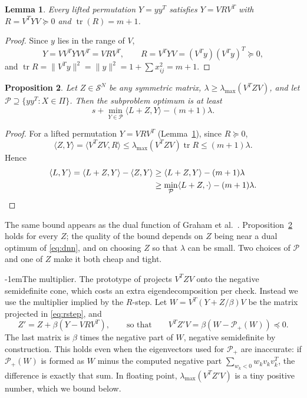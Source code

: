 \documentclass[10pt]{article}
\makeatletter
\renewcommand\paragraph{\@startsection{paragraph}{4}{\z@}{2.5ex plus 1ex minus .2ex}%
  {-1em}{\normalfont\normalsize\bfseries}}
\newtheorem{proposition}{Proposition}
\newtheorem{lemma}[proposition]{Lemma}
\theoremstyle{remark}
\newcommand{\Sym}{\mathcal{S}}
\newcommand{\tr}{\operatorname{tr}}
\newcommand{\inner}[2]{\langle #1, #2\rangle}
\newcommand{\lmax}{\lambda_{\max}}
\newcommand{\Pspd}{\mathcal{P}_{+}}
\makeatother
\begin{document}
\begin{lemma}\label{lem:trace}
Every lifted permutation $Y = yy^T$ satisfies $Y = VRV^T$ with
$R = V^TYV\succeq0$ and $\tr(R) = m+1$.
\end{lemma}
\begin{proof}
Since $y$ lies in the range of $V$,
\[
  Y = VV^TYVV^T = VRV^T, \qquad R = V^TYV = (V^Ty)(V^Ty)^T\succeq0,
\]
and $\tr R = \|V^Ty\|^2 = \|y\|^2 = 1 + \sum x_{ij}^2 = m+1$.
\end{proof}

\begin{proposition}\label{prop:cert}
Let $Z\in\Sym^N$ be any symmetric matrix, $\lambda \ge \lmax(V^TZV)$, and let
$\mathcal{P}\supseteq\{yy^T : X\in\Pi\}$. Then the subproblem optimum is at least
\begin{equation}\label{eq:cert}
  s + \min_{Y\in\mathcal{P}} \inner{L+Z}{Y} - (m+1)\lambda .
\end{equation}
\end{proposition}
\begin{proof}
For a lifted permutation $Y = VRV^T$ (Lemma~\ref{lem:trace}), since $R\succeq0$,
\[
  \inner{Z}{Y} = \inner{V^TZV}{R} \le \lmax(V^TZV)\tr R \le (m+1)\lambda .
\]
Hence
\begin{align*}
  \inner{L}{Y} = \inner{L+Z}{Y} - \inner{Z}{Y} &\ge \inner{L+Z}{Y} - (m+1)\lambda\\
  &\ge \min_{\mathcal{P}}\inner{L+Z}{\cdot} - (m+1)\lambda. \qedhere
\end{align*}
\end{proof}

The same bound appears as the dual function of Graham et al.\ \cite[eq.~(3.11),
Thm.~3.4]{graham}. Proposition~\ref{prop:cert} holds for every $Z$; the quality of
the bound depends on $Z$ being near a dual optimum of \eqref{eq:dnn}, and on
choosing $Z$ so that $\lambda$ can be small. Two choices of $\mathcal{P}$ and one of
$Z$ make it both cheap and tight.

\paragraph{The multiplier.} The prototype of \cite{owx} projects $V^TZV$ onto the
negative semidefinite cone, which costs an extra eigendecomposition per check.
Instead we use the multiplier implied by the $R$-step. Let $W = V^T(Y+Z/\beta)V$ be
the matrix projected in \eqref{eq:rstep}, and
\[
  Z' = Z + \beta(Y - VRV^T), \qquad\text{so that}\qquad V^TZ'V = \beta(W - \Pspd(W)) \preceq 0 .
\]
The last matrix is $\beta$ times the negative part of $W$, negative semidefinite by
construction. This holds even when the eigenvectors used for $\Pspd$ are
inaccurate: if $\Pspd(W)$ is formed as $W$ minus the computed negative part
$\sum_{w_k<0} w_k v_kv_k^T$, the difference is exactly that sum. In floating
point, $\lmax(V^TZ'V)$ is a tiny positive number, which we bound below.
\end{document}
